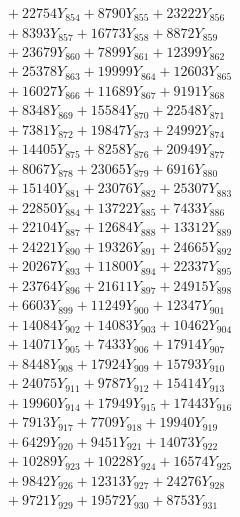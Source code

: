 \documentclass[a4paper,10pt]{article}
\begin{document}
{\begin{align}
&\;  + 22754 Y_{854} + 8790 Y_{855} + 23222 Y_{856} \\[0.3ex]
&\;  + 8393 Y_{857} + 16773 Y_{858} + 8872 Y_{859} \\[0.3ex]
&\;  + 23679 Y_{860} + 7899 Y_{861} + 12399 Y_{862} \\[0.3ex]
&\;  + 25378 Y_{863} + 19999 Y_{864} + 12603 Y_{865} \\[0.3ex]
&\;  + 16027 Y_{866} + 11689 Y_{867} + 9191 Y_{868} \\[0.5ex]\allowbreak
&\;  + 8348 Y_{869} + 15584 Y_{870} + 22548 Y_{871} \\[0.3ex]
&\;  + 7381 Y_{872} + 19847 Y_{873} + 24992 Y_{874} \\[0.3ex]
&\;  + 14405 Y_{875} + 8258 Y_{876} + 20949 Y_{877} \\[0.3ex]
&\;  + 8067 Y_{878} + 23065 Y_{879} + 6916 Y_{880} \\[0.3ex]
&\;  + 15140 Y_{881} + 23076 Y_{882} + 25307 Y_{883} \\[0.3ex]
&\;  + 22850 Y_{884} + 13722 Y_{885} + 7433 Y_{886} \\[0.3ex]
&\;  + 22104 Y_{887} + 12684 Y_{888} + 13312 Y_{889} \\[0.3ex]
&\;  + 24221 Y_{890} + 19326 Y_{891} + 24665 Y_{892} \\[0.3ex]
&\;  + 20267 Y_{893} + 11800 Y_{894} + 22337 Y_{895} \\[0.3ex]
&\;  + 23764 Y_{896} + 21611 Y_{897} + 24915 Y_{898} \\[0.5ex]\allowbreak
&\;  + 6603 Y_{899} + 11249 Y_{900} + 12347 Y_{901} \\[0.3ex]
&\;  + 14084 Y_{902} + 14083 Y_{903} + 10462 Y_{904} \\[0.3ex]
&\;  + 14071 Y_{905} + 7433 Y_{906} + 17914 Y_{907} \\[0.3ex]
&\;  + 8448 Y_{908} + 17924 Y_{909} + 15793 Y_{910} \\[0.3ex]
&\;  + 24075 Y_{911} + 9787 Y_{912} + 15414 Y_{913} \\[0.3ex]
&\;  + 19960 Y_{914} + 17949 Y_{915} + 17443 Y_{916} \\[0.3ex]
&\;  + 7913 Y_{917} + 7709 Y_{918} + 19940 Y_{919} \\[0.3ex]
&\;  + 6429 Y_{920} + 9451 Y_{921} + 14073 Y_{922} \\[0.3ex]
&\;  + 10289 Y_{923} + 10228 Y_{924} + 16574 Y_{925} \\[0.3ex]
&\;  + 9842 Y_{926} + 12313 Y_{927} + 24276 Y_{928} \\[0.5ex]\allowbreak
&\;  + 9721 Y_{929} + 19572 Y_{930} + 8753 Y_{931} \\[0.3ex]

\end{align}}
\end{document}
